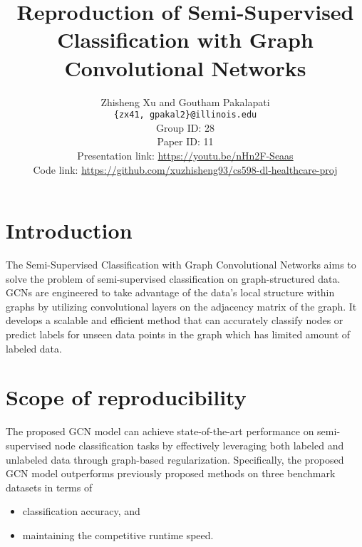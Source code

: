 \documentclass[11pt,a4paper]{article}
\title{Reproduction of Semi-Supervised Classification with Graph Convolutional Networks}
\author{Zhisheng Xu and Goutham Pakalapati\\
  \texttt{\{zx41, gpakal2\}@illinois.edu}
  \\[2em]
  Group ID: 28\\
  Paper ID: 11\\
  Presentation link: \url{https://youtu.be/nHn2F-Seaas} \\
  Code link: \url{https://github.com/xuzhisheng93/cs598-dl-healthcare-proj}
}
\begin{document}
\maketitle


\section{Introduction}

The Semi-Supervised Classification with Graph Convolutional Networks \cite{kipf2017semi} aims to solve the problem of semi-supervised classification on graph-structured data. GCNs are engineered to take advantage of the data's local structure within graphs by utilizing convolutional layers on the adjacency matrix of the graph. It develops a scalable and efficient method that can accurately classify nodes or predict labels for unseen data points in the graph which has limited amount of labeled data.

\section{Scope of reproducibility}

The proposed GCN model can achieve state-of-the-art performance on semi-supervised node classification tasks by effectively leveraging both labeled and unlabeled data through graph-based regularization. Specifically, the proposed GCN model outperforms previously proposed methods on three benchmark datasets in terms of

\begin{itemize}
    \item classification accuracy, and
    \item maintaining the competitive runtime speed.
\end{itemize}

\end{document}
